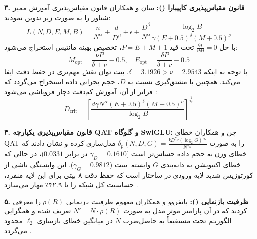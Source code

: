 \textbf{۳. قانون مقیاس‌پذیری کاپیبارا ():}
سان و همکاران \cite{sun2025scaling} قانون مقیاس‌پذیری آموزش ممیز شناور را به صورت زیر تدوین نمودند:
\begin{equation}
    L(N, D, E, M, B) = \frac{n}{N^\alpha} + \frac{d}{D^\beta} + \epsilon + \frac{D^\beta}{N^\alpha} \frac{\log_2 B}{\gamma (E+0.5)^\delta (M+0.5)^\nu}
\end{equation}
با حل $\frac{\partial L}{\partial M} = 0$ تحت قید $P = E + M + 1$، تخصیص بهینه مانتیس استخراج می‌شود:
\begin{equation}
    M_{\text{opt}} = \frac{\nu P}{\delta + \nu} - 0.5, \quad E_{\text{opt}} = \frac{\delta P}{\delta + \nu} - 0.5
\end{equation}
با توجه به اینکه $\delta = 3.1926 > \nu = 2.9543$، بیت توان نقش مهم‌تری در حفظ دقت ایفا می‌کند. همچنین با مشتق‌گیری نسبت به $D$، حجم بحرانی داده استخراج می‌گردد که فراتر از آن، آموزش کم‌دقت دچار فروپاشی می‌شود \cite{sun2025scaling}:
\begin{equation}
    D_{\text{crit}} = \left[ \frac{d \gamma N^\alpha (E+0.5)^\delta (M+0.5)^\nu}{\log_2 B} \right]^{\frac{1}{2\beta}}
\end{equation}

\textbf{۴. قانون مقیاس‌پذیری یکپارچه QAT و گلوگاه SwiGLU:}
چن و همکاران \cite{chen2025scaling} خطای QAT را به صورت $\delta_p(N, D, G) = \frac{k D^{\gamma_D} (\log_2 G)^{\gamma_G}}{N^{\gamma_N}}$ مدل‌سازی کرده و نشان دادند که خطای وزن به حجم داده حساس‌تر است ($\gamma_D = 0.1610$ در برابر $0.0331$)، در حالی که خطای اکتیویشن به دانه‌بندی $G$ وابسته است ($\gamma_G = 0.9812$). این وابستگی ناشی از کورتوزیس شدید لایه ورودی  در ساختار  است که حفظ دقت ۸ بیتی برای این لایه منفرد، حساسیت کل شبکه را تا ۴۲.۹٪ مهار می‌سازد \cite{chen2025scaling}.

\textbf{۵. ظرفیت بازنمایی ():}
پانفروو و همکاران \cite{panferov2025unified} مفهوم ظرفیت بازنمایی $\rho(R)$ را معرفی کردند که در آن پارامتر موثر مدل به صورت $N' = N \cdot \rho(R)$ تعریف شده و همگرایی الگوریتم  تحت  مستقیماً به حاصل‌ضرب $N$ در میانگین خطای بازسازی $\ell_2$ محدود می‌گردد \cite{panferov2025unified}.

